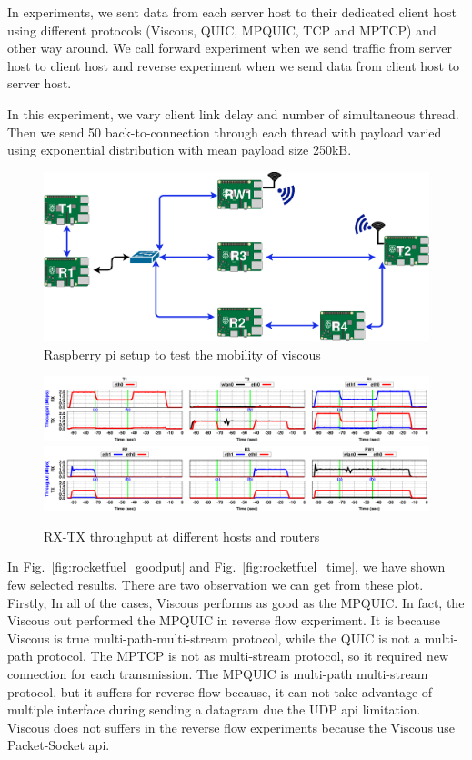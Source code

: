 In experiments, we sent data from each server host to their dedicated client host using different protocols (Viscous, QUIC, MPQUIC, TCP and MPTCP) and other way around. We call forward experiment when we send traffic from server host to client host and reverse experiment when we send data from client host to server host.

In this experiment, we vary client link delay and number of simultaneous thread. Then we send 50 back-to-connection through each thread with payload varied using exponential distribution with mean payload size 250kB. 


\begin{figure}
	\centering
	\includegraphics[width=.9\linewidth]{img/mobility/demo-Diagram.eps}
	\caption{\label{fig:mobility_diagram}Raspberry pi setup to test the mobility of viscous}
\end{figure}


\begin{figure}[h]
	\centering
	\includegraphics[width=\linewidth]{img/mobility/T1-T2-R1.eps}
	\includegraphics[width=\linewidth]{img/mobility/R2-R3-RW1.eps}
	\caption{\label{fig:mobility_res}RX-TX throughput at different hosts and routers}
\end{figure}

In Fig.~\ref{fig:rocketfuel_goodput} and Fig.~\ref{fig:rocketfuel_time}, we have shown few selected results. There are two observation we can get from these plot. Firstly, In all of the cases, Viscous performs as good as the MPQUIC. In fact, the Viscous out performed the MPQUIC in reverse flow experiment. It is because Viscous is true multi-path-multi-stream protocol, while the QUIC is not a multi-path protocol. The MPTCP is not as multi-stream protocol, so it required new connection for each transmission. The MPQUIC is multi-path multi-stream protocol, but it suffers for reverse flow because, it can not take advantage of multiple interface during sending a datagram due the UDP api limitation. Viscous does not suffers in the reverse flow experiments because the Viscous use Packet-Socket api.


